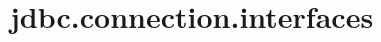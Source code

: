 \section{jdbc.connection.interfaces}
\label{configuration:JdbcConnectionInterfaces}
\AvailableInJavaOnly{\TODO}